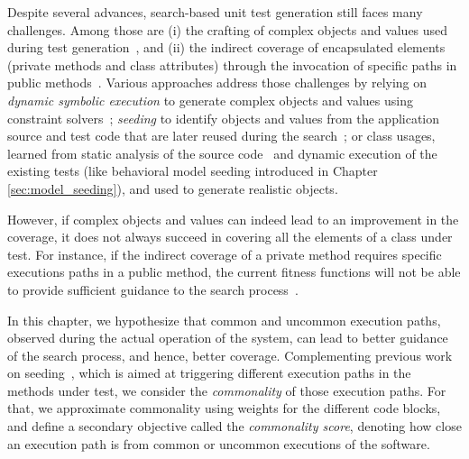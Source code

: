 


Despite several advances, search-based unit test generation still faces many challenges. Among those are (i) the crafting of complex objects and values used during test generation~\cite{almasi2017industrial}, and 
(ii) the indirect coverage of encapsulated elements (\eg private methods and class attributes) through the invocation of specific paths in public methods~\cite{Salahirad2019}. 
Various approaches address those challenges by relying on \emph{dynamic symbolic execution} to generate complex objects and values using constraint solvers~\cite{Inkumsah2008, Lakhotia2010, Galeotti2013, Gouraud2001}; 
\emph{seeding} to identify objects and values from the application source and test code that are later reused during the search~\cite{Rojas2016}; 
or class usages, learned from static analysis of the source code~\cite{Fraser2011a} and dynamic execution of the existing tests (like behavioral model seeding introduced in Chapter \ref{sec:model_seeding}), and used to generate realistic objects.

However, if complex objects and values can indeed lead to an improvement in the coverage, it does not always succeed in covering all the elements of a class under test. For instance, if the indirect coverage of a private method requires specific executions paths in a public method, the current fitness functions will not be able to provide sufficient guidance to the search process~\cite{Salahirad2019}. 

In this chapter, we hypothesize that common and uncommon execution paths, observed during the actual operation of the system, can lead to better guidance of the search process, and hence, better coverage. Complementing previous work on seeding~\cite{Rojas2016}, which is aimed at triggering different execution paths in the methods under test, we consider the \emph{commonality} of those execution paths. For that, we approximate commonality using weights for the different code blocks, and define a secondary objective called the \emph{commonality score}, denoting how close an execution path is from common or uncommon executions of the software.

